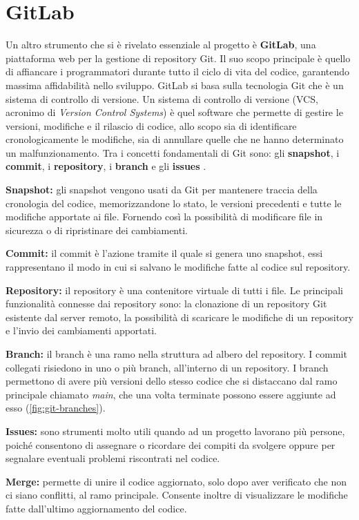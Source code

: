 \documentclass[italian, Lau, oneside, nodefaultfont, noexaminfo]{sapthesis}
\begin{document}
\section{GitLab}
Un altro strumento che si \`e rivelato essenziale al progetto \`e \textbf{GitLab}, una piattaforma web per la gestione di repository Git. Il suo scopo principale \`e quello di affiancare i programmatori durante tutto il ciclo di vita del codice, garantendo massima affidabilit\`a nello  sviluppo. GitLab si basa sulla tecnologia Git che \`e un sistema di controllo di versione. Un sistema di controllo di versione (VCS, acronimo di \textit{Version Control Systems}) \`e quel software che permette di gestire le versioni, modifiche e il rilascio di codice, allo scopo sia di identificare cronologicamente le modifiche, sia di annullare quelle che ne hanno determinato un malfunzionamento.  Tra i concetti fondamentali di Git sono: gli \textbf{snapshot}, i \textbf{commit}, i \textbf{repository}, i \textbf{branch}  e gli \textbf{issues} \cite{ref:Gitlab}.
\begin{description}
\item \textbf{Snapshot:} gli snapshot vengono usati da Git per mantenere traccia della cronologia del codice, memorizzandone lo stato, le versioni precedenti e tutte le modifiche apportate ai file. Fornendo cos\`i la possibilit\`a di modificare file in sicurezza o di ripristinare dei cambiamenti.
\item \textbf{Commit:} il commit \`e l’azione tramite il quale si genera uno snapshot, essi rappresentano il modo in cui si salvano le modifiche fatte al codice sul repository.
\item \textbf{Repository:} il repository \`e una contenitore virtuale di tutti i file. Le principali funzionalit\`a connesse dai repository sono:  la clonazione di un repository Git esistente dal server remoto,  la possibilit\`a di scaricare le modifiche di un repository e l'invio dei  cambiamenti apportati.
\item \textbf{Branch:} il branch \`e una ramo nella struttura ad albero del repository. I commit collegati risiedono in uno o pi\`u branch, all’interno di un repository. I branch permettono di avere pi\`u versioni dello stesso codice che si distaccano dal ramo principale chiamato \textit{main}, che una volta terminate possono essere aggiunte ad esso (\autoref{fig:git-branches}).
\item \textbf{Issues:} sono strumenti molto utili quando ad un progetto lavorano più persone, poich\'e consentono di assegnare o  ricordare dei compiti da svolgere oppure per segnalare eventuali problemi riscontrati nel codice.
\item \textbf{Merge:} permette di unire il codice aggiornato, solo dopo aver verificato che non ci siano conflitti,  al ramo principale. Consente inoltre di visualizzare le modifiche fatte dall'ultimo aggiornamento del codice.
\end{description}
\end{document}
